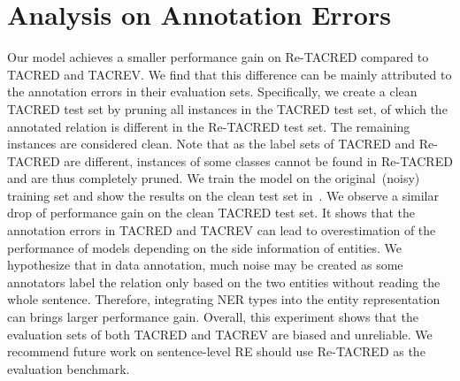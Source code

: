 \documentclass[11pt,a4paper]{article}
\begin{document}
\section{Analysis on Annotation Errors}\label{ssec:noise}
Our model achieves a smaller performance gain on Re-TACRED compared to TACRED and TACREV.
We find that this difference can be mainly attributed to the annotation errors in their evaluation sets.
Specifically, we create a clean TACRED test set by pruning all instances in the TACRED test set, of which the annotated relation is different in the Re-TACRED test set.
The remaining instances are considered clean.
Note that as the label sets of TACRED and Re-TACRED are different, instances of some classes cannot be found in Re-TACRED and are thus completely pruned.
We train the model on the original~(noisy) training set and show the results on the clean test set in~.
We observe a similar drop of performance gain on the clean TACRED test set.
It shows that the annotation errors in TACRED and TACREV can lead to overestimation of the performance of models depending on the side information of entities.
We hypothesize that in data annotation, much noise may be created as some annotators label the relation only based on the two entities without reading the whole sentence.
Therefore, integrating NER types into the entity representation can brings larger performance gain.
Overall, this experiment shows that the evaluation sets of both TACRED and TACREV are biased and unreliable.
We recommend future work on sentence-level RE should use Re-TACRED as the evaluation benchmark.
\end{document}
